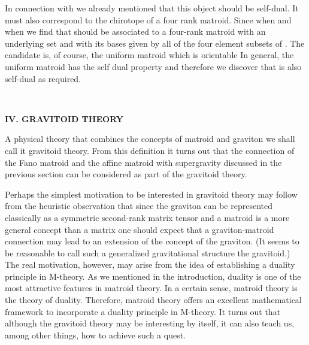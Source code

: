 \documentclass[a4paper,12pt]{article}
\begin{document}
In connection with \coordHE{} we already
mentioned that this object should be self-dual. It must also correspond to
the chirotope of a four rank matroid. Since \coordHE{} when \coordHE{} and \coordHE{} when \coordHE{} we find that \coordHE{} should be
associated to a four-rank matroid with an underlying set \coordHE{}
and with its bases given by all of the four element subsets of \coordHE{}. The
candidate is, of course, the uniform matroid \coordHE{} which is orientable\coordHE{}
In general, the uniform matroid \coordHE{} has the self dual property \coordHE{} and therefore we discover that \coordHE{} is also
self-dual as required.

\bigskip

\smallskip\ 

\noindent \textbf{IV. GRAVITOID THEORY}

\bigskip

A physical theory that combines the concepts of matroid and graviton we
shall call it gravitoid theory. From this definition it turns out that the
connection of the Fano matroid \coordHE{} and the affine matroid \coordHE{} with 
\coordHE{} supergravity discussed in the previous section can be considered as
part of the gravitoid theory.

Perhaps the simplest motivation to be interested in gravitoid theory may
follow from the heuristic observation that since the graviton can be
represented classically as a symmetric second-rank matrix tensor and a
matroid is a more general concept than a matrix one should expect that a
graviton-matroid connection may lead to an extension of the concept of the
graviton. (It seems to be reasonable to call such a generalized
gravitational structure the gravitoid.) The real motivation, however, may
arise from the idea of establishing a duality principle in M-theory. As we
mentioned in the introduction, duality is one of the most attractive
features in matroid theory. In a certain sense, matroid theory is the theory
of duality. Therefore, matroid theory offers an excellent mathematical
framework to incorporate a duality principle in M-theory. It turns out that
although the gravitoid theory may be interesting by itself, it can also
teach us, among other things, how to achieve such a quest.
\end{document}
